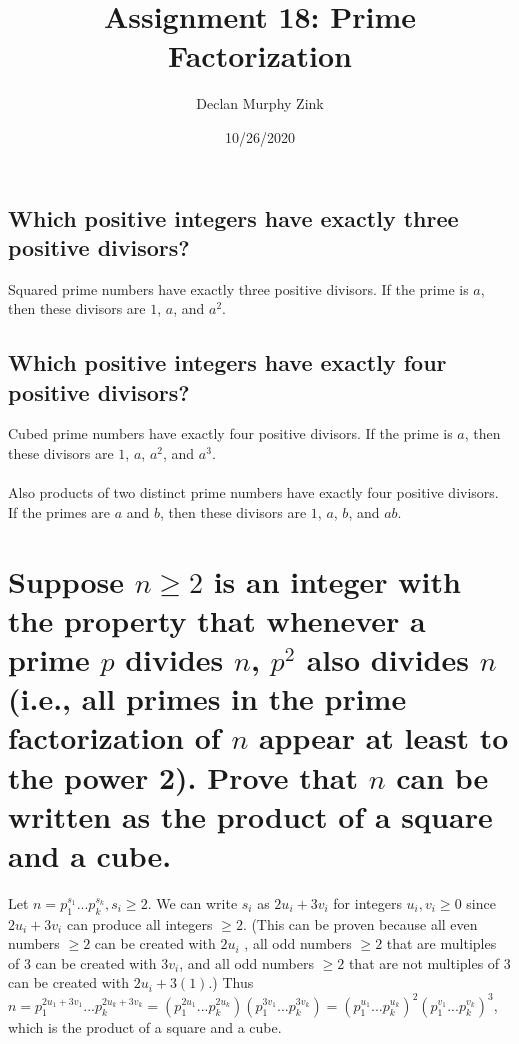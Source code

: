 \documentclass[12pt]{article}
\begin{document}
\title{Assignment 18: Prime Factorization}
\author{Declan Murphy Zink}
\date{10/26/2020}
\maketitle

\setcounter{section}{1}

\section{}
\subsection{Which positive integers have exactly three positive divisors?}
Squared prime numbers have exactly three positive divisors. If the prime is $a$, then these divisors are $1$, $a$, and $a^2$.

\subsection{Which positive integers have exactly four positive divisors?}
Cubed prime numbers have exactly four positive divisors. If the prime is $a$, then these divisors are $1$, $a$, $a^2$, and $a^3$. \\\\
Also products of two distinct prime numbers have exactly four positive divisors. If the primes are $a$ and $b$,
then these divisors are $1$, $a$, $b$, and $ab$.

\section{
    Suppose $n \geq 2$ is an integer with the property that whenever a prime $p$ divides $n$, $p^2$ also divides $n$
    (i.e., all primes in the prime factorization of $n$ appear at least to the power 2).
    Prove that $n$ can be written as the product of a square and a cube.
}
Let $n = p_1^{s_1}...p_k^{s_k}, s_i \geq 2$. We can write $s_i$ as $2u_i + 3v_i$
for integers $u_i, v_i \geq 0$ since $2u_i + 3v_i$ can produce all integers $\geq 2$.
(This can be proven because all even numbers $\geq 2$ can be created with $2u_i$ , 
all odd numbers $ \geq 2$ that are multiples of 3 can be created with $3v_i$,
and all odd numbers $ \geq 2$ that are not multiples of 3 can be created with $2u_i + 3(1)$.)
Thus $n = p_1^{2u_1 + 3v_1}...p_k^{2u_k + 3v_k} = (p_1^{2u_1}...p_k^{2u_k})(p_1^{3v_1}...p_k^{3v_k}) = (p_1^{u_1}...p_k^{u_k})^2(p_1^{v_1}...p_k^{v_k})^3$,
which is the product of a square and a cube.
\end{document}
